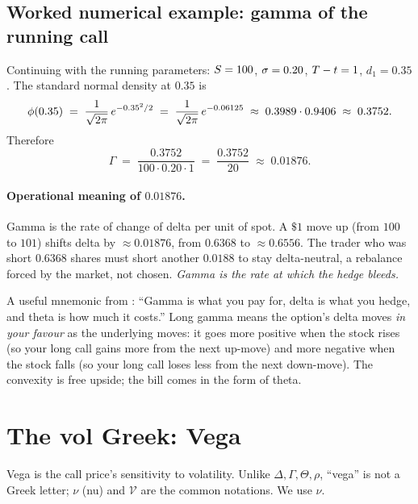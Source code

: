 \subsection{Worked numerical example: gamma of the running call}
\label{subsec:ch16_gamma_numex}

Continuing with the running parameters: $S = 100$, $\sigma = 0.20$,
$T - t = 1$, $d_1 = 0.35$. The standard normal density at $0.35$
is
\begin{equation*}
  \phi(0.35) \;=\; \frac{1}{\sqrt{2\pi}}\,e^{-0.35^2/2}
                 \;=\; \frac{1}{\sqrt{2\pi}}\,e^{-0.06125}
                 \;\approx\; 0.3989 \cdot 0.9406
                 \;\approx\; 0.3752.
\end{equation*}
Therefore
\begin{equation}
  \Gamma \;=\; \frac{0.3752}{100 \cdot 0.20 \cdot 1}
            \;=\; \frac{0.3752}{20}
            \;\approx\; 0.01876.
  \label{eq:gamma_numex}
\end{equation}

\paragraph{Operational meaning of $0.01876$.}
Gamma is the rate of change of delta per unit of spot. A $\$1$ move
up (from $100$ to $101$) shifts delta by $\approx 0.01876$, from
$0.6368$ to $\approx 0.6556$. The trader who was short $0.6368$
shares must short another $0.0188$ to stay delta-neutral, a
rebalance forced by the market, not chosen. \emph{Gamma is the rate
at which the hedge bleeds.}

\begin{intuitionbox}
A useful mnemonic from \citeNatenberg: ``Gamma is what you pay for,
delta is what you hedge, and theta is how much it costs.'' Long
gamma means the option's delta moves \emph{in your favour} as the
underlying moves: it goes more positive when the stock rises (so
your long call gains more from the next up-move) and more negative
when the stock falls (so your long call loses less from the next
down-move). The convexity is free upside; the bill comes in the
form of theta.
\end{intuitionbox}

\section{The vol Greek: Vega}
\label{sec:ch16_vega}

Vega is the call price's sensitivity to volatility. Unlike
$\Delta, \Gamma, \Theta, \rho$, ``vega'' is not a Greek letter;
$\nu$ (nu) and $\mathcal{V}$ are the common notations. We use
$\nu$.

